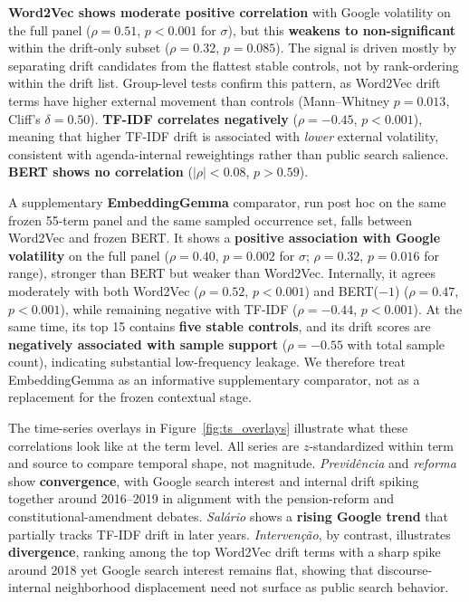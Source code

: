 \documentclass[12pt]{article}
\begin{document}
\textbf{Word2Vec shows moderate positive correlation} with Google volatility on
the full panel ($\rho = 0.51$, $p < 0.001$ for $\sigma$), but this
\textbf{weakens to non-significant} within the drift-only subset ($\rho = 0.32$,
$p = 0.085$). The signal is driven mostly by separating drift candidates from
the flattest stable controls, not by rank-ordering within the drift list.
Group-level tests confirm this pattern, as Word2Vec drift terms have higher external
movement than controls (Mann--Whitney $p = 0.013$, Cliff's $\delta = 0.50$).
\textbf{TF-IDF correlates negatively} ($\rho = -0.45$, $p < 0.001$), meaning
that higher TF-IDF drift is associated with \emph{lower} external volatility,
consistent with agenda-internal reweightings rather than public search
salience. \textbf{BERT shows no correlation} ($|\rho| < 0.08$, $p > 0.59$).

A supplementary \textbf{EmbeddingGemma} comparator, run post hoc on the same
frozen 55-term panel and the same sampled occurrence set, falls between
Word2Vec and frozen BERT. It shows a \textbf{positive association with Google
volatility} on the full panel ($\rho = 0.40$, $p = 0.002$ for $\sigma$;
$\rho = 0.32$, $p = 0.016$ for range), stronger than BERT but weaker than
Word2Vec. Internally, it agrees moderately with both Word2Vec ($\rho = 0.52$,
$p < 0.001$) and BERT($-1$) ($\rho = 0.47$, $p < 0.001$), while remaining
negative with TF-IDF ($\rho = -0.44$, $p < 0.001$). At the same time, its top
15 contains \textbf{five stable controls}, and its drift scores are
\textbf{negatively associated with sample support} ($\rho = -0.55$ with total
sample count), indicating substantial low-frequency leakage. We therefore treat
EmbeddingGemma as an informative supplementary comparator, not as a replacement
for the frozen contextual stage.

The time-series overlays in Figure~\ref{fig:ts_overlays} illustrate what these
correlations look like at the term level. All series are $z$-standardized
within term and source to compare temporal shape, not magnitude.
\textit{Previd\^encia} and \textit{reforma} show \textbf{convergence}, with
Google search interest and internal drift spiking together around 2016--2019 in
alignment with the pension-reform and constitutional-amendment debates.
\textit{Sal\'ario} shows a \textbf{rising Google trend} that partially tracks
TF-IDF drift in later years. \textit{Interven\c{c}\~ao}, by contrast,
illustrates \textbf{divergence}, ranking among the top Word2Vec drift terms
with a sharp spike around 2018 yet Google search interest remains flat,
showing that discourse-internal neighborhood displacement need not surface as
public search behavior.
\end{document}
